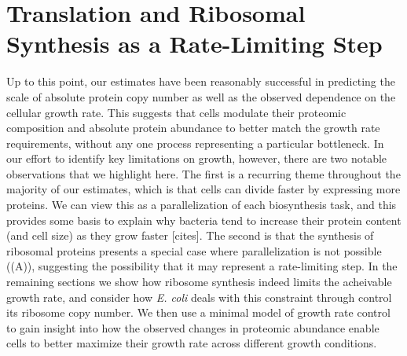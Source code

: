 \section{Translation and Ribosomal Synthesis as a Rate-Limiting Step}
Up to this point, our estimates have been reasonably successful in predicting
the scale of absolute protein copy number as well as the observed dependence on
the cellular growth rate. This suggests that cells modulate their proteomic
composition and absolute protein abundance to better match the growth rate
requirements, without any one process representing a particular bottleneck. In
our effort to identify key limitations on growth, however, there are two notable
observations that we highlight here. The first is a recurring theme throughout
the majority of our estimates, which is that cells can divide faster by
expressing more proteins. We can view this as a parallelization of each
biosynthesis task, and this provides some basis to explain why bacteria tend to
increase their protein content (and cell size) as they grow faster [cites]. The
second is that the synthesis of ribosomal proteins presents a special case where
parallelization is not possible ((A)), suggesting the
possibility that it may represent a rate-limiting step.  In the remaining
sections we show how ribosome synthesis indeed limits the acheivable growth
rate, and consider how \textit{E. coli} deals with this constraint through
control its ribosome copy number. We then use a minimal model of growth rate
control to gain insight into how the observed changes in proteomic abundance
enable cells to better maximize their growth rate across different growth
conditions.


